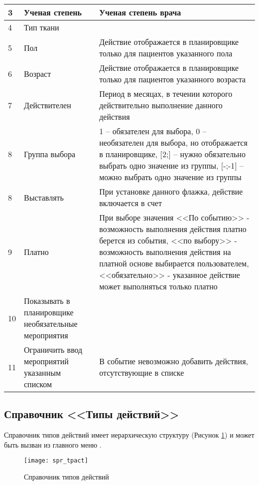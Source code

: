 {\begin{longtable}{|p{0.55cm}|p{4cm}|p{12cm}|}
3	& Ученая степень &	Ученая степень врача \\ \hline
4	& Тип ткани & \\ \hline	
5	& Пол	& Действие отображается в планировщике только для пациентов указанного пола \\ \hline
6	& Возраст	& Действие отображается в планировщике только для пациентов указанного возраста \\ \hline
7	& Действителен	& Период в месяцах, в течении которого действительно выполнение данного действия \\ \hline
8	& Группа выбора &	1 – обязателен для выбора, 0 – необязателен для выбора, но отображается в планировщике, [2;] – нужно обязательно выбрать одно значение из группы, [-;-1] – можно выбрать одно значение из группы \\ \hline
8	& Выставлять	& При установке данного флажка, действие включается в счет \\ \hline
9	& Платно	& При выборе значения <<По событию>> - возможность выполнения действия платно берется из события, <<по выбору>> - возможность выполнения действия на платной основе выбирается пользователем, <<обязательно>> - указанное действие может выполняться только платно \\ \hline
10	& Показывать в планировщике необязательные мероприятия & \\ \hline	
11	& Ограничить ввод мероприятий указанным списком &	В событие невозможно добавить действия, отсутствующие в списке \\ \hline
\end{longtable}
}
 
\subsection{Справочник <<Типы действий>>}

Справочник типов действий имеет иерархическую структуру (Рисунок \ref{img_spr_tpact}) и может быть вызван из главного меню .

\begin{figure}[ht]\centering
 \texttt{[image: spr\_tpact]}
 \caption{Справочник типов действий}
 \label{img_spr_tpact}
\end{figure}

